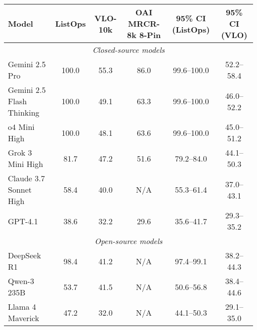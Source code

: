 \documentclass{article}
\begin{document}
\begin{table}[htbp]
  \centering
  \scriptsize
  {
    \setlength{\arrayrulewidth}{0.01pt}
    \setlength{\tabcolsep}{1em}
    \begin{tabular}{l|ccc|cc}
      \toprule
      \textbf{Model}            & \textbf{ListOps} & \textbf{VLO-10k} & \textbf{OAI MRCR-8k 8-Pin}\footnotemark & \textbf{95\% CI (ListOps)} & \textbf{95\% CI (VLO)} \\
      \midrule
      \multicolumn{6}{c}{\itshape Closed-source models}                                                                                                               \\ [2pt]
      Gemini 2.5 Pro            & 100.0            & 55.3             & 86.0                                    & 99.6–100.0                 & 52.2–58.4              \\
      Gemini 2.5 Flash Thinking & 100.0            & 49.1             & 63.3                                    & 99.6–100.0                 & 46.0–52.2              \\
      o4 Mini High              & 100.0            & 48.1             & 63.6                                    & 99.6–100.0                 & 45.0–51.2              \\
      Grok 3 Mini High          & 81.7             & 47.2             & 51.6                                    & 79.2–84.0                  & 44.1–50.3              \\
      Claude 3.7 Sonnet High    & 58.4             & 40.0             & N/A                                     & 55.3–61.4                  & 37.0–43.1              \\
      GPT-4.1                   & 38.6             & 32.2             & 29.6                                    & 35.6–41.7                  & 29.3–35.2              \\
      \midrule
      \multicolumn{6}{c}{\itshape Open-source models}                                                                                                                 \\ [2pt]
      DeepSeek R1               & 98.4             & 41.2             & N/A                                     & 97.4–99.1                  & 38.2–44.3              \\
      Qwen-3 235B               & 53.7             & 41.5             & N/A                                     & 50.6–56.8                  & 38.4–44.6              \\
      Llama 4 Maverick          & 47.2             & 32.0             & N/A                                     & 44.1–50.3                  & 29.1–35.0              \\

\end{tabular}}
\end{table}
\end{document}
